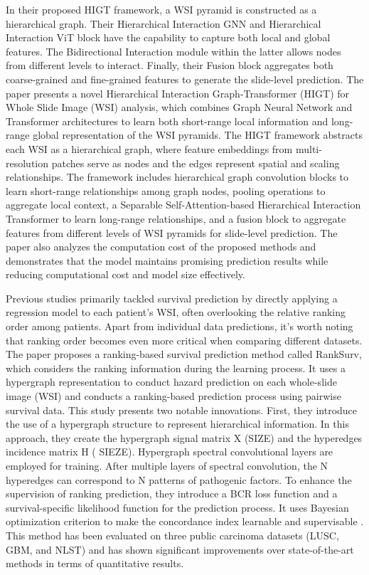 \documentclass[journal,twoside,web]{ieeecolor}
\begin{document}
In their proposed HIGT framework\cite{guo2023higt}, a WSI pyramid is constructed as a hierarchical graph. Their Hierarchical Interaction GNN and Hierarchical Interaction ViT block have the capability to capture both local and global features. The Bidirectional Interaction module within the latter allows nodes from different levels to interact. Finally, their Fusion block aggregates both coarse-grained and fine-grained features to generate the slide-level prediction.
The paper presents a novel Hierarchical Interaction Graph-Transformer (HIGT) for Whole Slide Image (WSI) analysis, which combines Graph Neural Network and Transformer architectures to learn both short-range local information and long-range global representation of the WSI pyramids.
The HIGT framework abstracts each WSI as a hierarchical graph, where feature embeddings from multi-resolution patches serve as nodes and the edges represent spatial and scaling relationships.
The framework includes hierarchical graph convolution blocks to learn short-range relationships among graph nodes, pooling operations to aggregate local context, a Separable Self-Attention-based Hierarchical Interaction Transformer to learn long-range relationships, and a fusion block to aggregate features from different levels of WSI pyramids for slide-level prediction.
The paper also analyzes the computation cost of the proposed methods and demonstrates that the model maintains promising prediction results while reducing computational cost and model size effectively.

Previous studies primarily tackled survival prediction by directly applying a regression model to each patient's WSI, often overlooking the relative ranking order among patients. Apart from individual data predictions, it's worth noting that ranking order becomes even more critical when comparing different datasets. The paper proposes a ranking-based survival prediction method called RankSurv\cite{di2020ranking}, which considers the ranking information during the learning process. It uses a hypergraph representation to conduct hazard prediction on each whole-slide image (WSI) and conducts a ranking-based prediction process using pairwise survival data. This study presents two notable innovations. First, they introduce the use of a hypergraph structure to represent hierarchical information. In this approach, they create the hypergraph signal matrix X (SIZE) and the hyperedges incidence matrix H ( SIEZE). Hypergraph spectral convolutional layers are employed for training. After multiple layers of spectral convolution, the N hyperedges can correspond to N patterns of pathogenic factors. To enhance the supervision of ranking prediction, they introduce a BCR loss function and a survival-specific likelihood function for the prediction process. It uses Bayesian optimization criterion to make the concordance index learnable and supervisable . This method has been evaluated on three public carcinoma datasets (LUSC, GBM, and NLST) and has shown significant improvements over state-of-the-art methods in terms of quantitative results.
\end{document}
